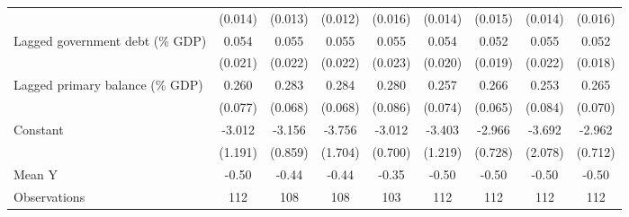 {\begin{tabular}{l*{8}{c}}
                    &     (0.014)         &     (0.013)         &     (0.012)         &     (0.016)         &     (0.014)         &     (0.015)         &     (0.014)         &     (0.016)         \\
\addlinespace
Lagged government debt (\% GDP)&       0.054\sym{**} &       0.055\sym{**} &       0.055\sym{**} &       0.055\sym{**} &       0.054\sym{**} &       0.052\sym{**} &       0.055\sym{**} &       0.052\sym{**} \\
                    &     (0.021)         &     (0.022)         &     (0.022)         &     (0.023)         &     (0.020)         &     (0.019)         &     (0.022)         &     (0.018)         \\
\addlinespace
Lagged primary balance (\% GDP)&       0.260\sym{***}&       0.283\sym{***}&       0.284\sym{***}&       0.280\sym{***}&       0.257\sym{***}&       0.266\sym{***}&       0.253\sym{***}&       0.265\sym{***}\\
                    &     (0.077)         &     (0.068)         &     (0.068)         &     (0.086)         &     (0.074)         &     (0.065)         &     (0.084)         &     (0.070)         \\
\addlinespace
Constant            &      -3.012\sym{**} &      -3.156\sym{***}&      -3.756\sym{**} &      -3.012\sym{***}&      -3.403\sym{**} &      -2.966\sym{***}&      -3.692\sym{*}  &      -2.962\sym{***}\\
                    &     (1.191)         &     (0.859)         &     (1.704)         &     (0.700)         &     (1.219)         &     (0.728)         &     (2.078)         &     (0.712)         \\
\midrule
Mean Y              &       -0.50         &       -0.44         &       -0.44         &       -0.35         &       -0.50         &       -0.50         &       -0.50         &       -0.50         \\
Observations        &         112         &         108         &         108         &         103         &         112         &         112         &         112         &         112         \\
\bottomrule
\end{tabular}
}
